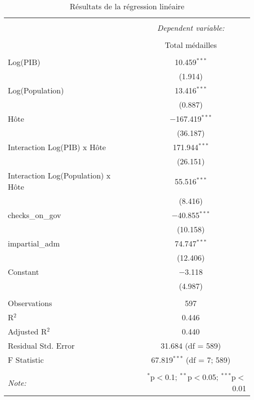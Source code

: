 
\begin{table}[!htbp] \centering 
  \caption{Résultats de la régression linéaire} 
  \label{tab:regression_results} 
\begin{tabular}{@{\extracolsep{5pt}}lc} 
\\[-1.8ex]\hline 
\hline \\[-1.8ex] 
 & \multicolumn{1}{c}{\textit{Dependent variable:}} \\ 
\cline{2-2} 
\\[-1.8ex] & Total médailles \\ 
\hline \\[-1.8ex] 
 Log(PIB) & 10.459$^{***}$ \\ 
  & (1.914) \\ 
  Log(Population) & 13.416$^{***}$ \\ 
  & (0.887) \\ 
  Hôte & $-$167.419$^{***}$ \\ 
  & (36.187) \\ 
  Interaction Log(PIB) x Hôte & 171.944$^{***}$ \\ 
  & (26.151) \\ 
  Interaction Log(Population) x Hôte & 55.516$^{***}$ \\ 
  & (8.416) \\ 
  checks\_on\_gov & $-$40.855$^{***}$ \\ 
  & (10.158) \\ 
  impartial\_adm & 74.747$^{***}$ \\ 
  & (12.406) \\ 
  Constant & $-$3.118 \\ 
  & (4.987) \\ 
 \hline \\[-1.8ex] 
Observations & 597 \\ 
R$^{2}$ & 0.446 \\ 
Adjusted R$^{2}$ & 0.440 \\ 
Residual Std. Error & 31.684 (df = 589) \\ 
F Statistic & 67.819$^{***}$ (df = 7; 589) \\ 
\hline 
\hline \\[-1.8ex] 
\textit{Note:}  & \multicolumn{1}{r}{$^{*}$p$<$0.1; $^{**}$p$<$0.05; $^{***}$p$<$0.01} \\ 
\end{tabular} 
\end{table} 
